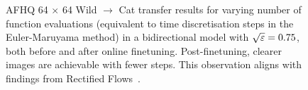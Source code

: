 \documentclass{article}
\begin{document}
\begin{figure}[htbp] 
    \centering 
    \hfill
    \hfill
    \caption{AFHQ 64 $\times$ 64 Wild $\rightarrow$ Cat transfer results for varying number of function evaluations (equivalent to time discretisation steps in the Euler-Maruyama method) in a bidirectional model with $\sqrt{\varepsilon}=0.75$, both  before and after online finetuning. Post-finetuning, clearer images are achievable with fewer steps. This observation aligns with findings from Rectified Flows~\citep{liu_flow_2023}.} 
    \label{fig:afhq_nfe_sweep} 
\end{figure}
\end{document}
